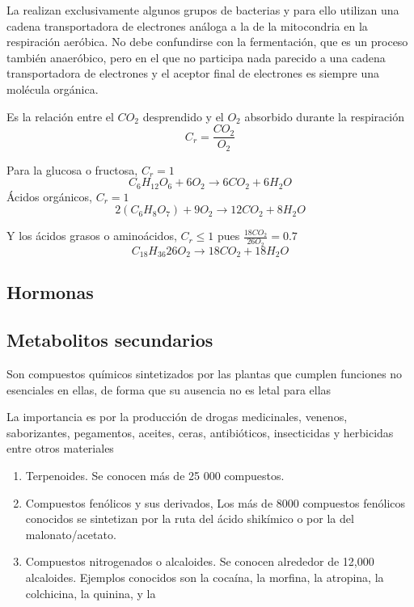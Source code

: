 La realizan exclusivamente algunos grupos de bacterias y para ello utilizan una cadena transportadora de electrones análoga a la de la mitocondria en la respiración aeróbica. No debe confundirse con la fermentación, que es un proceso también anaeróbico, pero en el que no participa nada parecido a una cadena transportadora de electrones y el aceptor final de electrones es siempre una molécula orgánica.

\begin{definition}
    Es la relación entre el $CO_2$ desprendido y el $O_2$ absorbido durante la respiración
    \begin{equation}
        C_r = \frac{CO_2}{O_2}
    \end{equation}
\end{definition}

Para la glucosa o fructosa, $C_r=1$
\begin{equation}
    C_6H_{12}O_6 + 6O_2 \longrightarrow 6CO_2 + 6H_2O
\end{equation}
Ácidos orgánicos, $C_r=1$
\begin{equation}
    2\left( C_6H_8O_7 \right) + 9O_2 \longrightarrow 12CO_2 + 8H_2O
\end{equation}

Y los ácidos grasos o aminoácidos, $C_r\leq 1$ pues $\frac{18CO_2}{26O_2}=0.7$
\begin{equation}
    C_{18}H_{36}26O_2 \longrightarrow 18CO_2 + 18H_2O
\end{equation}

\subsection{Hormonas}

\subsection{Metabolitos secundarios}

Son compuestos químicos sintetizados por las plantas que cumplen funciones no esenciales en ellas, de forma que su ausencia no es letal para ellas

La importancia es por la producción  de drogas medicinales, venenos, saborizantes, pegamentos, aceites, ceras, antibióticos, insecticidas y herbicidas entre otros materiales

\begin{enumerate}
    \item Terpenoides. Se conocen más de 25 000 compuestos.
    \item Compuestos fenólicos y sus derivados, Los más de 8000 compuestos fenólicos conocidos se sintetizan por la ruta del ácido shikímico o por la del malonato/acetato.
    \item Compuestos nitrogenados o alcaloides. Se conocen alrededor de 12,000 alcaloides. Ejemplos conocidos son la cocaína, la morfina, la atropina, la colchicina, la quinina, y la
\end{enumerate}

